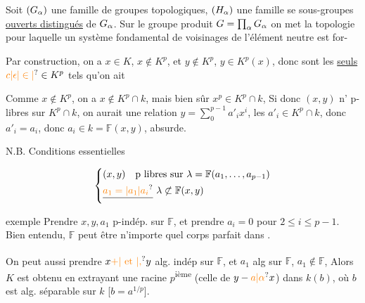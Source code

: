 Soit $(G_{\alpha})$ une famille de groupes topologiques, $(H_{\alpha})$ une famille se sous-groupes \uline{ouverts distingués} de $G_{\alpha}$. Sur le groupe produit $G=\prod_{\alpha}G_{\alpha}$ on met la topologie pour laquelle un système fondamental de voisinages de l'élément neutre est for-


Par construction, on a $x\in K$, $x\notin K^p$,  et $y\notin K^p$, $y\in K^p(x)$, donc \deleted{$\alpha,\beta$}  sont les \uline{seuls} $\unsure{c|\epsilon|\in|\vphantom{c}}\in K^p$ tels qu'on ait  

Comme $x\notin K^p$, on a $x\notin K^p\cap k$, mais bien sûr $x^p\in K^p\cap k$, Si donc $(x,y)$ n'  p-libres sur $K^p\cap k$, on aurait une relation $y=\sum_0^{p-1}a'_i x^i$, les $a'_i\in K^p\cap k$, donc   $a'_i=a_i$, donc $a_i\in k=\mathbb F(x,y)$, absurde.

N.B. Conditions essentielles

\[ \left\{\begin{aligned} &(x,y)\quad\text{p libres sur }\lambda=\mathbb F(a_1,\ldots,a_{p-1})\\ &\deleted{\unsure{a_1=|a_1|a_i}}\ \lambda\not\subset\mathbb F(x,y)\end{aligned}\right. \]

 exemple  Prendre $x,y,a_1$  p-indép. sur $\mathbb F$,  et prendre $a_i=0$ pour $2\leq i\leq p-1$. Bien entendu, $\mathbb F$ peut être n'importe quel corps parfait dans .

On peut aussi prendre $x\unsure{+|\ \text{et}\ |,}y$ alg. indép sur $\mathbb F$, et $a_1$ alg\textsuperscript{}  sur $\mathbb F$, $a_1\notin\mathbb F$, Alors $K$ est obtenu  en extrayant une racine $p$\textsuperscript{ième} (celle de $y-\unsure{a|\alpha}x$) dans $k(b)$, où $b$ est alg. séparable sur $k$ [$b=a^{1/p}$].

